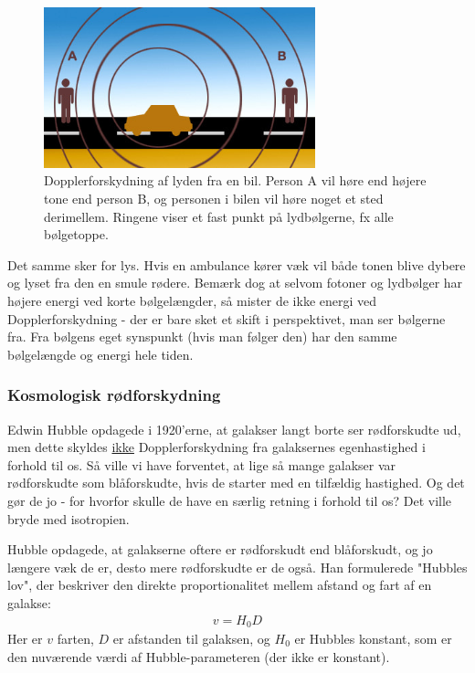 \begin{figure}[h!]
	\centering
	\includegraphics[width=0.7\textwidth]{Astrofysik/Astrofig/doppler.jpg}
	\caption{Dopplerforskydning af lyden fra en bil. Person A vil høre end højere tone end person B, og personen i bilen vil høre noget et sted derimellem. Ringene viser et fast punkt på lydbølgerne, fx alle bølgetoppe.}
	\label{shapes}
\end{figure}

Det samme sker for lys. Hvis en ambulance kører væk vil både tonen blive dybere og lyset fra den en smule rødere. Bemærk dog at selvom fotoner og lydbølger har højere energi ved korte bølgelængder, så mister de ikke energi ved Dopplerforskydning - der er bare sket et skift i perspektivet, man ser bølgerne fra. Fra bølgens eget synspunkt (hvis man følger den) har den samme bølgelængde og energi hele tiden.
\subsubsection{Kosmologisk rødforskydning}
Edwin Hubble opdagede i 1920'erne, at galakser langt borte ser rødforskudte ud, men dette skyldes \underline{ikke} Dopplerforskydning fra galaksernes egenhastighed i forhold til os. Så ville vi have forventet, at lige så mange galakser var rødforskudte som blåforskudte, hvis de starter med en tilfældig hastighed. Og det gør de jo - for hvorfor skulle de have en særlig retning i forhold til os? Det ville bryde med isotropien. 

Hubble opdagede, at galakserne oftere er rødforskudt end blåforskudt, og jo længere væk de er, desto mere rødforskudte er de også. Han formulerede "Hubbles lov", der beskriver den direkte proportionalitet mellem afstand og fart af en galakse:
\begin{align}
v=H_0 D
\end{align}
Her er $v$ farten, $D$ er afstanden til galaksen, og $H_0$ er Hubbles konstant, som er den nuværende værdi af Hubble-parameteren (der ikke er konstant).

